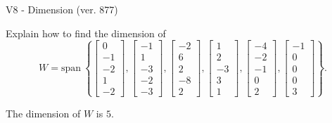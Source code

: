 \begin{exercise}
  \begin{exerciseTitle}V8 - Dimension (ver. 877)\end{exerciseTitle}
  \begin{exerciseStatement}
    Explain how to find the dimension of 
\[W=\mathrm{span}\ \left\{\left[\begin{array}{r}
0 \\
-1 \\
-2 \\
1 \\
-2
\end{array}\right] , \left[\begin{array}{r}
-1 \\
1 \\
-3 \\
-2 \\
-3
\end{array}\right] , \left[\begin{array}{r}
-2 \\
6 \\
2 \\
-8 \\
2
\end{array}\right] , \left[\begin{array}{r}
1 \\
2 \\
-3 \\
3 \\
1
\end{array}\right] , \left[\begin{array}{r}
-4 \\
-2 \\
-1 \\
0 \\
2
\end{array}\right] , \left[\begin{array}{r}
-1 \\
0 \\
0 \\
0 \\
3
\end{array}\right]\right\}.\]



  \end{exerciseStatement}
  \begin{exerciseAnswer}
   The dimension of \(W\) is  \(5\).
  


  \end{exerciseAnswer}
\end{exercise}